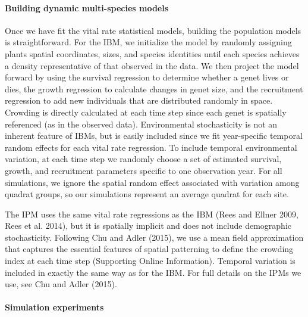 \documentclass[12pt,]{article}
\begin{document}
\paragraph{Building dynamic multi-species
models}\label{building-dynamic-multi-species-models}

Once we have fit the vital rate statistical models, building the
population models is straightforward. For the IBM, we initialize the
model by randomly assigning plants spatial coordinates, sizes, and
species identities until each species achieves a density representative
of that observed in the data. We then project the model forward by using
the survival regression to determine whether a genet lives or dies, the
growth regression to calculate changes in genet size, and the
recruitment regression to add new individuals that are distributed
randomly in space. Crowding is directly calculated at each time step
since each genet is spatially referenced (as in the observed data).
Environmental stochasticity is not an inherent feature of IBMs, but is
easily included since we fit year-specific temporal random effects for
each vital rate regression. To include temporal environmental variation,
at each time step we randomly choose a set of estimated survival,
growth, and recruitment parameters specific to one observation year. For
all simulations, we ignore the spatial random effect associated with
variation among quadrat groups, so our simulations represent an average
quadrat for each site.

The IPM uses the same vital rate regressions as the IBM (Rees and Ellner
2009, Rees et al. 2014), but it is spatially implicit and does not
include demographic stochasticity. Following Chu and Adler (2015), we
use a mean field approximation that captures the essential features of
spatial patterning to define the crowding index at each time step
(Supporting Online Information). Temporal variation is included in
exactly the same way as for the IBM. For full details on the IPMs we
use, see Chu and Adler (2015).

\paragraph{Simulation experiments}\label{simulation-experiments}
\end{document}
